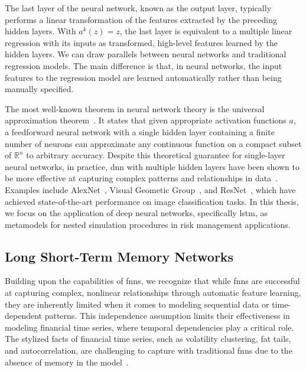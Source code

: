 The last layer of the neural network, known as the output layer, typically performs a linear transformation of the features extracted by the preceding hidden layers.
With $a^{k}(z) = z$, the last layer is equivalent to a multiple linear regression with its inputs as transformed, high-level features learned by the hidden layers.
We can draw parallels between neural networks and traditional regression models.
The main difference is that, in neural networks, the input features to the regression model are learned automatically rather than being manually specified.

The most well-known theorem in neural network theory is the universal approximation theorem~\citep{hornik1989multilayer}.
It states that given appropriate activation functions $a$, a feedforward neural network with a single hidden layer containing a finite number of neurons can approximate any continuous function on a compact subset of $\mathbb{R}^n$ to arbitrary accuracy.
Despite this theoretical guarantee for single-layer neural networks, in practice, \gls{dnn} with multiple hidden layers have been shown to be more effective at capturing complex patterns and relationships in data~\citep{lecun2015deep}.
Examples include AlexNet~\citep{krizhevsky2012imagenet}, Visual Geometic Group~\citep{simonyan2014very}, and ResNet~\citep{he2016deep}, which have achieved state-of-the-art performance on image classification tasks.
In this thesis, we focus on the application of deep neural networks, specifically \gls{lstm}, as metamodels for nested simulation procedures in risk management applications.

\subsection{Long Short-Term Memory Networks} \label{subsec:LSTM}

Building upon the capabilities of \gls{fnn}s, we recognize that while \gls{fnn}s are successful at capturing complex, nonlinear relationships through automatic feature learning, they are inherently limited when it comes to modeling sequential data or time-dependent patterns.
This independence assumption limits their effectiveness in modeling financial time series, where temporal dependencies play a critical role.
The stylized facts of financial time series, such as volatility clustering, fat tails, and autocorrelation, are challenging to capture with traditional \gls{fnn}s due to the absence of memory in the model~\citep{cont2001empirical}.

